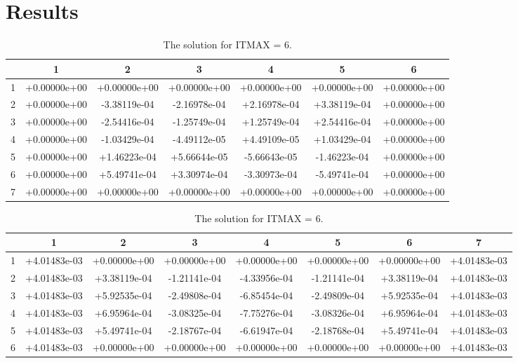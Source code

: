 \documentclass{article}
\begin{document}
\section*{Results}

\def\arraystretch{1.00}
\begin{table}[H]
	\scriptsize
	\centering
	\caption{The solution for ITMAX = 6.}
	\vspace{0.2cm}
	\begin{tabular}{c|S|S|S|S|S|S}
		& {1} & {2} & {3} & {4} & {5} & {6} \\
		 & +0.00000e+00 & +0.00000e+00 & +0.00000e+00 & +0.00000e+00 & +0.00000e+00 & +0.00000e+00 \\
		2 & +0.00000e+00 & -3.38119e-04 & -2.16978e-04 & +2.16978e-04 & +3.38119e-04 & +0.00000e+00 \\
		3 & +0.00000e+00 & -2.54416e-04 & -1.25749e-04 & +1.25749e-04 & +2.54416e-04 & +0.00000e+00 \\
		4 & +0.00000e+00 & -1.03429e-04 & -4.49112e-05 & +4.49109e-05 & +1.03429e-04 & +0.00000e+00 \\
		5 & +0.00000e+00 & +1.46223e-04 & +5.66644e-05 & -5.66643e-05 & -1.46223e-04 & +0.00000e+00 \\
		6 & +0.00000e+00 & +5.49741e-04 & +3.30974e-04 & -3.30973e-04 & -5.49741e-04 & +0.00000e+00 \\
		7 & +0.00000e+00 & +0.00000e+00 & +0.00000e+00 & +0.00000e+00 & +0.00000e+00 & +0.00000e+00
	\end{tabular}
	\label{table:symmetric-u}
\end{table}

\def\arraystretch{1.00}
\begin{table}[H]
	\scriptsize
	\centering
	\caption{The solution for ITMAX = 6.}
	\vspace{0.2cm}
	\begin{tabular}{c|S|S|S|S|S|S|S}
		& {1} & {2} & {3} & {4} & {5} & {6} & {7} \\
		 & +4.01483e-03 & +0.00000e+00 & +0.00000e+00 & +0.00000e+00 & +0.00000e+00 & +0.00000e+00 & +4.01483e-03 \\
		2 & +4.01483e-03 & +3.38119e-04 & -1.21141e-04 & -4.33956e-04 & -1.21141e-04 & +3.38119e-04 & +4.01483e-03 \\
		3 & +4.01483e-03 & +5.92535e-04 & -2.49808e-04 & -6.85454e-04 & -2.49809e-04 & +5.92535e-04 & +4.01483e-03 \\
		4 & +4.01483e-03 & +6.95964e-04 & -3.08325e-04 & -7.75276e-04 & -3.08326e-04 & +6.95964e-04 & +4.01483e-03 \\
		5 & +4.01483e-03 & +5.49741e-04 & -2.18767e-04 & -6.61947e-04 & -2.18768e-04 & +5.49741e-04 & +4.01483e-03 \\
		6 & +4.01483e-03 & +0.00000e+00 & +0.00000e+00 & +0.00000e+00 & +0.00000e+00 & +0.00000e+00 & +4.01483e-03
	\end{tabular}
	\label{table:symmetric-v}
\end{table}
\end{document}
